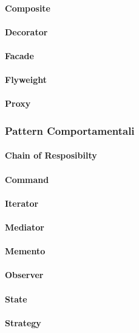 \documentclass{article}
\begin{document}
            \paragraph{Composite}
            \paragraph{Decorator}
            \paragraph{Facade}
            \paragraph{Flyweight}
            \paragraph{Proxy}
        \subsubsection{Pattern Comportamentali}
            \paragraph{Chain of Resposibilty}
            \paragraph{Command}
            \paragraph{Iterator}
            \paragraph{Mediator}
            \paragraph{Memento}
            \paragraph{Observer}
            \paragraph{State}
            \paragraph{Strategy}
\end{document}
